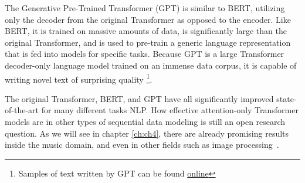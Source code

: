 The Generative Pre-Trained Transformer (GPT) is similar to BERT, utilizing only the decoder from the original Transformer as opposed to the encoder. Like BERT, it is trained on massive amounts of data, is significantly large than the original Transformer, and is used to pre-train a generic language representation that is fed into models for specific tasks. Because GPT is a large Transformer decoder-only language model trained on an immense data corpus, it is capable of writing novel text of surprising quality \footnote{Samples of text written by GPT can be found \href{https://openai.com/blog/better-language-models/}{online}}. 


The original Transformer, BERT, and GPT have all significantly improved state-of-the-art for many different tasks NLP. How effective attention-only Transformer models are in other types of sequential data modeling is still an open research question. As we will see in chapter \ref{ch:ch4}, there are already promising results inside the music domain, and even in other fields such as image processing~\cite{dosovitskiy2020image}. 


 